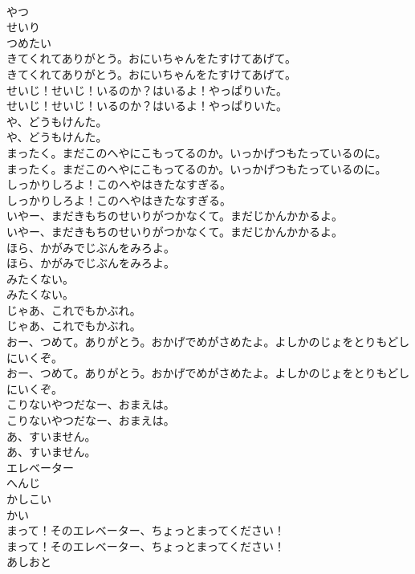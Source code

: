\documentclass[8pt]{extreport}
\begin{document}
\begin{CJK}{UTF8}{min}
\\	やつ
\\	せいり
\\	つめたい
\\	きてくれてありがとう。おにいちゃんをたすけてあげて。	
\\	きてくれてありがとう。おにいちゃんをたすけてあげて。 
\\	せいじ！せいじ！いるのか？はいるよ！やっぱりいた。	
\\	せいじ！せいじ！いるのか？はいるよ！やっぱりいた。 
\\	や、どうもけんた。	
\\	や、どうもけんた。 
\\	まったく。まだこのへやにこもってるのか。いっかげつもたっているのに。	
\\	まったく。まだこのへやにこもってるのか。いっかげつもたっているのに。 
\\	しっかりしろよ！このへやはきたなすぎる。	
\\	しっかりしろよ！このへやはきたなすぎる。 
\\	いやー、まだきもちのせいりがつかなくて。まだじかんかかるよ。	
\\	いやー、まだきもちのせいりがつかなくて。まだじかんかかるよ。 
\\	ほら、かがみでじぶんをみろよ。	
\\	ほら、かがみでじぶんをみろよ。 
\\	みたくない。	
\\	みたくない。 
\\	じゃあ、これでもかぶれ。	
\\	じゃあ、これでもかぶれ。 
\\	おー、つめて。ありがとう。おかげでめがさめたよ。よしかのじょをとりもどしにいくぞ。	
\\	おー、つめて。ありがとう。おかげでめがさめたよ。よしかのじょをとりもどしにいくぞ。 
\\	こりないやつだなー、おまえは。	
\\	こりないやつだなー、おまえは。 
\\	あ、すいません。	
\\	あ、すいません。 
\\	エレベーター
\\	へんじ
\\	かしこい
\\	かい
\\	まって！そのエレベーター、ちょっとまってください！	
\\	まって！そのエレベーター、ちょっとまってください！ 
\\	あしおと

\end{CJK}
\end{document}
